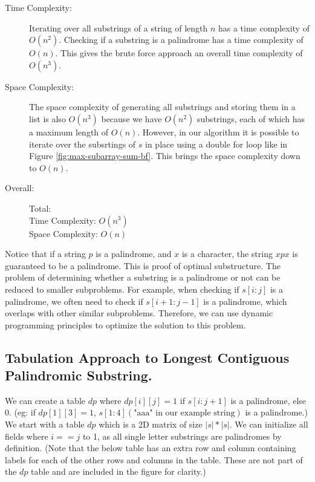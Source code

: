 \begin{description}
    \item[Time Complexity:]
        Iterating over all substrings of a string of length $n$ has a time complexity of $O(n^2)$.
        Checking if a substring is a palindrome has a time complexity of $O(n)$.
        This gives the brute force approach an overall time complexity of $O(n^3)$.
        
    \item[Space Complexity:] 
        The space complexity of generating all substrings and storing them in a list is also $O(n^3)$
        because we have $O(n^2)$ substrings, each of which has a maximum length of $O(n)$.
        However, in our algorithm it is possible to iterate over the subsrtings of $s$ in place using a double for loop
        like in Figure \ref{fig:max-subarray-sum-bf}. This brings the space complexity down to $O(n)$.
        
    \item[Overall:] Total:\\
        Time Complexity: $O(n^3)$\\
        Space Complexity: $O(n)$
    
\end{description}
Notice that if a string $p$ is a palindrome, and $x$ is a character, the string $xpx$ is guaranteed to be a palindrome.
This is proof of optimal substructure.
The problem of determining whether a substring is a palindrome or not can be reduced to smaller subproblems.
For example, when checking if $s[i:j]$ is a palindrome, we often need to check if $s[i+1:j-1]$ is a palindrome,
which overlaps with other similar subproblems.
Therefore, we can use dynamic programming principles to optimize the solution to this problem.
\subsection{Tabulation Approach to Longest Contiguous Palindromic Substring.}
We can create a table $dp$ where $dp[i][j] = 1$ if $s[i:j+1]$ is a palindrome, else 0. (eg: if $dp[1][3] = 1$, $s[1:4] (\text{"aaa" in our example string})$ is a palindrome.)
We start with a table $dp$ which is a 2D matrix of size $|s| * |s|$.
We can initialize all fields where $i == j$ to 1, as all single letter substrings are palindromes by definition. (Note that the below table has an extra row and column containing labels for each of the other rows and columns in the table. These are not part of the $dp$ table and are included in the figure for clarity.)

